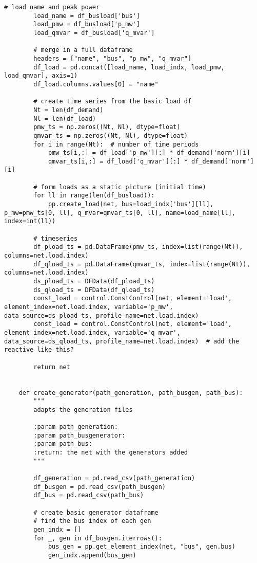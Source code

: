 \begin{lstlisting}[caption={Main code in Python with the Pandapower library}]
        # load name and peak power
        load_name = df_busload['bus']
        load_pmw = df_busload['p_mw']
        load_qmvar = df_busload['q_mvar']

        # merge in a full dataframe
        headers = ["name", "bus", "p_mw", "q_mvar"]
        df_load = pd.concat([load_name, load_indx, load_pmw, load_qmvar], axis=1)
        df_load.columns.values[0] = "name"

        # create time series from the basic load df
        Nt = len(df_demand)
        Nl = len(df_load)
        pmw_ts = np.zeros((Nt, Nl), dtype=float)
        qmvar_ts = np.zeros((Nt, Nl), dtype=float)
        for i in range(Nt):  # number of time periods
            pmw_ts[i,:] = df_load['p_mw'][:] * df_demand['norm'][i]
            qmvar_ts[i,:] = df_load['q_mvar'][:] * df_demand['norm'][i]

        # form loads as a static picture (initial time)
        for ll in range(len(df_busload)):
            pp.create_load(net, bus=load_indx['bus'][ll], p_mw=pmw_ts[0, ll], q_mvar=qmvar_ts[0, ll], name=load_name[ll], index=int(ll))

        # timeseries
        df_pload_ts = pd.DataFrame(pmw_ts, index=list(range(Nt)), columns=net.load.index)
        df_qload_ts = pd.DataFrame(qmvar_ts, index=list(range(Nt)), columns=net.load.index)
        ds_pload_ts = DFData(df_pload_ts)
        ds_qload_ts = DFData(df_qload_ts)
        const_load = control.ConstControl(net, element='load', element_index=net.load.index, variable='p_mw', data_source=ds_pload_ts, profile_name=net.load.index)
        const_load = control.ConstControl(net, element='load', element_index=net.load.index, variable='q_mvar', data_source=ds_qload_ts, profile_name=net.load.index)  # add the reactive like this?

        return net


    def create_generator(path_generation, path_busgen, path_bus):
        """
        adapts the generation files

        :param path_generation:
        :param path_busgenerator:
        :param path_bus:
        :return: the net with the generators added
        """

        df_generation = pd.read_csv(path_generation)
        df_busgen = pd.read_csv(path_busgen)
        df_bus = pd.read_csv(path_bus)

        # create basic generator dataframe
        # find the bus index of each gen
        gen_indx = []
        for _, gen in df_busgen.iterrows():
            bus_gen = pp.get_element_index(net, "bus", gen.bus)
            gen_indx.append(bus_gen)


\end{lstlisting}
